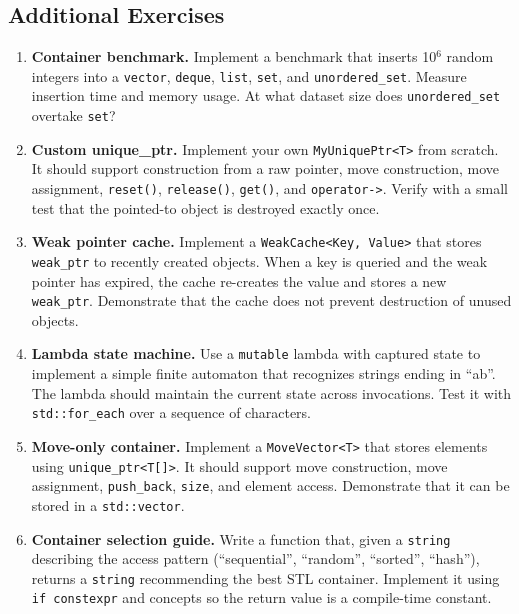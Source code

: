 \subsection{Additional Exercises}

\begin{enumerate}
\item \textbf{Container benchmark.} Implement a benchmark that inserts 10$^{6}$ random integers into a \texttt{vector}, \texttt{deque}, \texttt{list}, \texttt{set}, and \texttt{unordered\_set}. Measure insertion time and memory usage. At what dataset size does \texttt{unordered\_set} overtake \texttt{set}?

\item \textbf{Custom unique\_ptr.} Implement your own \texttt{MyUniquePtr<T>} from scratch. It should support construction from a raw pointer, move construction, move assignment, \texttt{reset()}, \texttt{release()}, \texttt{get()}, and \texttt{operator->}. Verify with a small test that the pointed-to object is destroyed exactly once.

\item \textbf{Weak pointer cache.} Implement a \texttt{WeakCache<Key, Value>} that stores \texttt{weak\_ptr} to recently created objects. When a key is queried and the weak pointer has expired, the cache re-creates the value and stores a new \texttt{weak\_ptr}. Demonstrate that the cache does not prevent destruction of unused objects.

\item \textbf{Lambda state machine.} Use a \texttt{mutable} lambda with captured state to implement a simple finite automaton that recognizes strings ending in ``ab''. The lambda should maintain the current state across invocations. Test it with \texttt{std::for\_each} over a sequence of characters.

\item \textbf{Move-only container.} Implement a \texttt{MoveVector<T>} that stores elements using \texttt{unique\_ptr<T[]>}. It should support move construction, move assignment, \texttt{push\_back}, \texttt{size}, and element access. Demonstrate that it can be stored in a \texttt{std::vector}.

\item \textbf{Container selection guide.} Write a function that, given a \texttt{string} describing the access pattern (``sequential'', ``random'', ``sorted'', ``hash''), returns a \texttt{string} recommending the best STL container. Implement it using \texttt{if constexpr} and concepts so the return value is a compile-time constant.


\end{enumerate}
